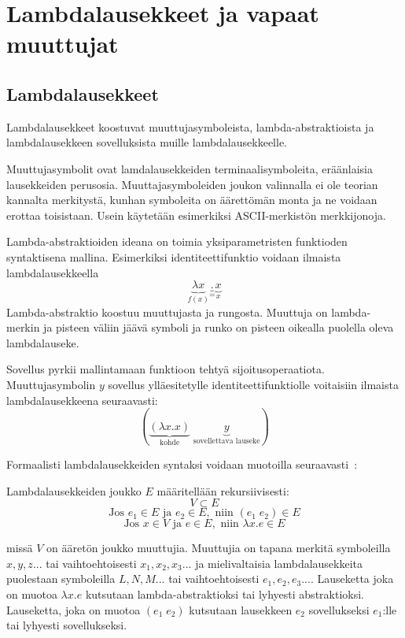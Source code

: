\section{Lambdalausekkeet ja vapaat muuttujat}

\subsection{Lambdalausekkeet}

Lambdalausekkeet koostuvat muuttujasymboleista, lambda-abstraktioista ja lambdalausekkeen sovelluksista muille lambdalausekkeelle.
\par 
Muuttujasymbolit ovat lamdalausekkeiden terminaalisymboleita, eräänlaisia lausekkeiden perusosia. Muuttajasymboleiden joukon valinnalla ei ole teorian kannalta merkitystä, kunhan symboleita on äärettömän monta ja ne voidaan erottaa toisistaan. Usein käytetään esimerkiksi ASCII-merkistön merkkijonoja.
\par
Lambda-abstraktioiden ideana on toimia yksiparametristen funktioden syntaktisena mallina. Esimerkiksi identiteettifunktio voidaan ilmaista lambdalausekkeella 
\[ \underbrace{ \lambda x }_{ f(x) } \underbrace{ . }_{ = }  \underbrace{ x }_{x} \]
Lambda-abstraktio koostuu muuttujasta ja rungosta. Muuttuja on lambda-merkin ja pisteen väliin jäävä symboli ja runko on pisteen oikealla puolella oleva lambdalauseke. 
\par
Sovellus pyrkii mallintamaan funktioon tehtyä sijoitusoperaatiota. Muuttujasymbolin $y$ sovellus ylläesitetylle identiteettifunktiolle voitaisiin ilmaista lambdalausekkeena seuraavasti:
\[ ( \underbrace{ (\lambda x . x ) }_{ \text{kohde} } \; \underbrace{ y }_{ \text{sovellettava lauseke} } ) \]
\par
Formaalisti lambdalausekkeiden syntaksi voidaan muotoilla seuraavasti~\cite[s.~8]{Hudak89}:

\begin{maar}[lambdalausekkeet]
Lambdalausekkeiden joukko $E$ määritellään rekursiivisesti: 
\[ V \subset E \]
\[ \text{Jos } e_{1} \in E \text{ ja } e_{2} \in E, \text{ niin }  (e_{1} \; e_{2}) \in E \]
\[ \text{Jos } x \in V \text{ ja } e \in E, \text{ niin } \lambda x.e \in E \]

missä $V$ on ääretön joukko muuttujia. Muuttujia on tapana merkitä symboleilla $x, y,z...$ tai vaihtoehtoisesti $x_{1}, x_{2}, x_{3}...$ ja mielivaltaisia lambdalausekkeita puolestaan symboleilla $L, N, M ...$ tai vaihtoehtoisesti $e_{1}, e_{2}, e_{3}...$.  Lauseketta joka on muotoa $\lambda x.e$ kutsutaan lambda-abstraktioksi tai lyhyesti abstraktioksi. Lauseketta, joka on muotoa $(e_{1} \; e_{2})$ kutsutaan lausekkeen $e_{2}$ sovellukseksi $e_{1}$:lle tai lyhyesti sovellukseksi.
\end{maar}

